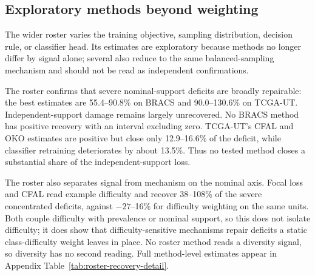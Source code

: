 \documentclass[11pt]{article}
\newcommand{\resultstable}[1]{}
\begin{document}
\subsection{Exploratory methods beyond weighting}
\label{sec:rq2-roster}
The wider roster varies the training objective, sampling distribution, decision rule, or classifier head. Its estimates are exploratory because methods no longer differ by signal alone; several also reduce to the same balanced-sampling mechanism and should not be read as independent confirmations.

\begin{table}[ht]
  \centering
  \small
  \resultstable{roster_recovery_summary}
  \caption{Most informative recovery results from the exploratory method roster.}
  \label{tab:roster-recovery}
\end{table}

\noindent The roster confirms that severe nominal-support deficits are broadly repairable: the best estimates are \num{55.4}--\num{90.8}\% on BRACS and \num{90.0}--\num{130.6}\% on TCGA-UT. Independent-support damage remains largely unrecovered. No BRACS method has positive recovery with an interval excluding zero. TCGA-UT's CFAL and OKO estimates are positive but close only \num{12.9}--\num{16.6}\% of the deficit, while classifier retraining deteriorates by about \num{13.5}\%. Thus no tested method closes a substantial share of the independent-support loss.

The roster also separates signal from mechanism on the nominal axis. Focal loss and CFAL read example difficulty and recover \num{38}--\num{108}\% of the severe concentrated deficits, against $-\num{27}$--\num{16}\% for difficulty weighting on the same units. Both couple difficulty with prevalence or nominal support, so this does not isolate difficulty; it does show that difficulty-sensitive mechanisms repair deficits a static class-difficulty weight leaves in place. No roster method reads a diversity signal, so diversity has no second reading. Full method-level estimates appear in Appendix Table~\ref{tab:roster-recovery-detail}.
\end{document}
